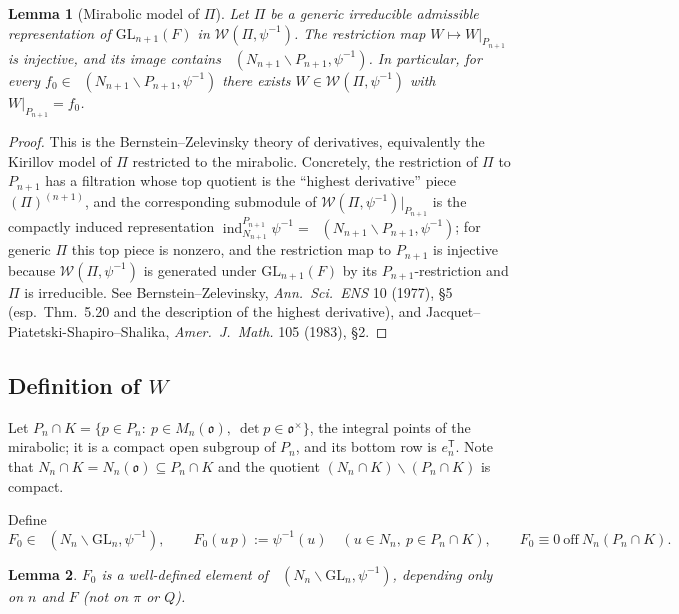 \documentclass[12pt]{article}
\newcommand{\GL}{\mathrm{GL}}
\newcommand{\oo}{\mathfrak{o}}
\newcommand{\Wmod}{\mathcal{W}}
\DeclareMathOperator{\Cc}{C_c^\infty}
\newtheorem{lemma}{Lemma}
\begin{document}
\begin{lemma}[Mirabolic model of $\Pi$]\label{lem:miraPi}
Let $\Pi$ be a generic irreducible admissible representation of $\GL_{n+1}(F)$ in
$\Wmod(\Pi,\psi^{-1})$. The restriction map $W\mapsto W|_{P_{n+1}}$ is injective,
and its image contains $\Cc(N_{n+1}\backslash P_{n+1},\psi^{-1})$. In particular,
for every $f_0\in\Cc(N_{n+1}\backslash P_{n+1},\psi^{-1})$ there exists
$W\in\Wmod(\Pi,\psi^{-1})$ with $W|_{P_{n+1}}=f_0$.
\end{lemma}

\begin{proof}
This is the Bernstein--Zelevinsky theory of derivatives, equivalently the Kirillov
model of $\Pi$ restricted to the mirabolic. Concretely, the restriction of $\Pi$ to
$P_{n+1}$ has a filtration whose top quotient is the ``highest derivative'' piece
$(\Pi)^{(n+1)}$, and the corresponding submodule of $\Wmod(\Pi,\psi^{-1})|_{P_{n+1}}$
is the compactly induced representation
$\operatorname{ind}_{N_{n+1}}^{P_{n+1}}\psi^{-1}=\Cc(N_{n+1}\backslash P_{n+1},\psi^{-1})$;
for generic $\Pi$ this top piece is nonzero, and the restriction map to $P_{n+1}$ is
injective because $\Wmod(\Pi,\psi^{-1})$ is generated under $\GL_{n+1}(F)$ by its
$P_{n+1}$-restriction and $\Pi$ is irreducible. See
Bernstein--Zelevinsky, \emph{Ann.\ Sci.\ ENS} 10 (1977), \S5 (esp.\ Thm.\ 5.20 and
the description of the highest derivative), and
Jacquet--Piatetski-Shapiro--Shalika, \emph{Amer.\ J.\ Math.} 105 (1983), \S2.
\end{proof}

\subsection{Definition of $W$}

Let $P_n\cap K=\{p\in P_n:\ p\in M_n(\oo),\ \det p\in\oo^\times\}$, the integral
points of the mirabolic; it is a compact open subgroup of $P_n$, and its bottom row
is $e_n^{\mathsf T}$. Note that $N_n\cap K=N_n(\oo)\subseteq P_n\cap K$ and the
quotient $(N_n\cap K)\backslash(P_n\cap K)$ is compact.

Define
\begin{equation}\label{eq:F0}
  F_0\in\Cc(N_n\backslash\GL_n,\psi^{-1}),\qquad
  F_0(u\,p):=\psi^{-1}(u)\quad(u\in N_n,\ p\in P_n\cap K),\qquad
  F_0\equiv0\ \text{off}\ N_n(P_n\cap K).
\end{equation}

\begin{lemma}\label{lem:F0wd}
$F_0$ is a well-defined element of $\Cc(N_n\backslash\GL_n,\psi^{-1})$, depending
only on $n$ and $F$ (not on $\pi$ or $Q$).
\end{lemma}
\end{document}
